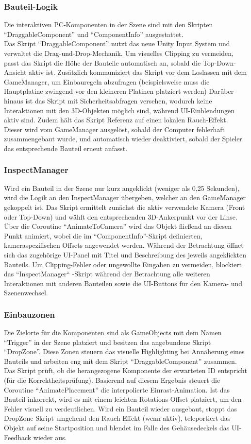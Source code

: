 \subsubsection*{Bauteil-Logik}
Die interaktiven PC-Komponenten in der Szene sind mit den Skripten “DraggableComponent” und “ComponentInfo” ausgestattet.\\
Das Skript “DraggableComponent” nutzt das neue Unity Input System und verwaltet die Drag-und-Drop-Mechanik. Um visuelles Clipping zu vermeiden, passt das Skript die Höhe der Bauteile automatisch an, sobald die Top-Down-Ansicht aktiv ist. Zusätzlich kommuniziert das Skript vor dem Loslassen mit dem GameManager, um Einbauregeln abzufragen (beispielsweise muss die Hauptplatine zwingend vor den kleineren Platinen platziert werden) Darüber hinaus ist das Skript mit Sicherheitsabfragen versehen, wodurch keine Interaktionen mit den 3D-Objekten möglich sind, während UI-Einblendungen aktiv sind. Zudem hält das Skript Referenz auf einen lokalen Rauch-Effekt. Dieser wird vom GameManager ausgelöst, sobald der Computer fehlerhaft zusammengebaut wurde, und automatisch wieder deaktiviert, sobald der Spieler das entsprechende Bauteil erneut anfasst.

\subsubsection*{InspectManager}
Wird ein Bauteil in der Szene nur kurz angeklickt (weniger als 0,25 Sekunden), wird die Logik an den InspectManager übergeben, welcher an den GameManager gekoppelt ist. Das Skript ermittelt zunächst die aktiv verwendete Kamera (Front oder Top-Down) und wählt den entsprechenden 3D-Ankerpunkt vor der Linse. Über die Coroutine “AnimateToCamera” wird das Objekt fließend an diesen Punkt animiert, wobei die im “ComponentInfo”-Skript definierten, kameraspezifischen Offsets angewendet werden. Während der Betrachtung öffnet sich das zugehörige UI-Panel mit Titel und Beschreibung des jeweils angeklickten Bauteils. Um Clipping-Fehler oder ungewollte Eingaben zu vermeiden, blockiert das “InspectManager“ -Skript während der Betrachtung alle weiteren Interaktionen mit anderen Bauteilen sowie die UI-Buttons für den Kamera- und Szenenwechsel.

\subsubsection*{Einbauzonen}
Die Zielorte für die Komponenten sind als GameObjects mit dem Namen “Trigger” in der Szene platziert und besitzen das angebundene Skript “DropZone”. Diese Zonen steuern das visuelle Highlighting bei Annäherung eines Bauteils und arbeiten eng mit dem Skript “DraggableComponent” zusammen. Das Skript prüft, ob die herangezogene Komponente der erwarteten ID entspricht (für die Korrektheitsprüfung). Basierend auf diesem Ergebnis steuert die Coroutine “AnimatePlacement” die interpolierte Einrast-Animation. Ist das Bauteil inkorrekt, wird es mit einem leichten Rotations-Offset platziert, um den Fehler visuell zu verdeutlichen. Wird ein Bauteil wieder ausgebaut, stoppt das DropZone-Skript umgehend den Rauch-Effekt (wenn aktiv), teleportiert das Objekt auf seine Startposition und blendet im Falle des Gehäusedeckels das UI-Feedback wieder aus.

